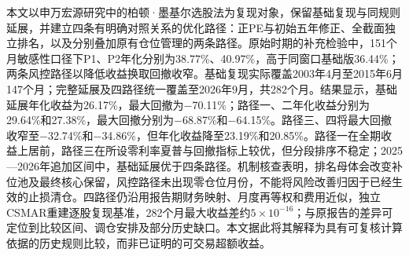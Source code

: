 
\begin{cnabstract}
本文以申万宏源研究中的柏顿·墨基尔选股法为复现对象，保留基础复现与同规则延展，并建立四条有明确对照关系的优化路径：正PE与初始五年修正、全截面独立排名，以及分别叠加原有仓位管理的两条路径。原始时期的补充检验中，151个月敏感性口径下P1、P2年化分别为38.77\%、40.97\%，高于同窗口基础版36.44\%；两条风控路径以降低收益换取回撤收窄。基础复现实际覆盖2003年4月至2015年6月147个月；完整延展及四路径统一覆盖至2026年9月，共282个月。结果显示，基础延展年化收益为26.17\%，最大回撤为$-$70.11\%；路径一、二年化收益分别为29.64\%和27.38\%，最大回撤分别为$-$68.87\%和$-$64.15\%。路径三、四将最大回撤收窄至$-$32.74\%和$-$34.86\%，但年化收益降至23.19\%和20.85\%。路径一在全期收益上居前，路径三在所设零利率夏普与回撤指标上较优，但分段排序不稳定；2025—2026年追加区间中，基础延展优于四条路径。机制核查表明，排名母体会改变补位池及最终核心保留，风控路径未出现零仓位月份，不能将风险改善归因于已经生效的止损清仓。四路径仍沿用报告期财务映射、月度再等权和费用近似，独立CSMAR重建逐股复现基准，282个月最大收益差约$5\times10^{-16}$；与原报告的差异可定位到比较区间、调仓安排及部分历史缺口。本文据此将其解释为具有可复核计算依据的历史规则比较，而非已证明的可交易超额收益。
\end{cnabstract}
